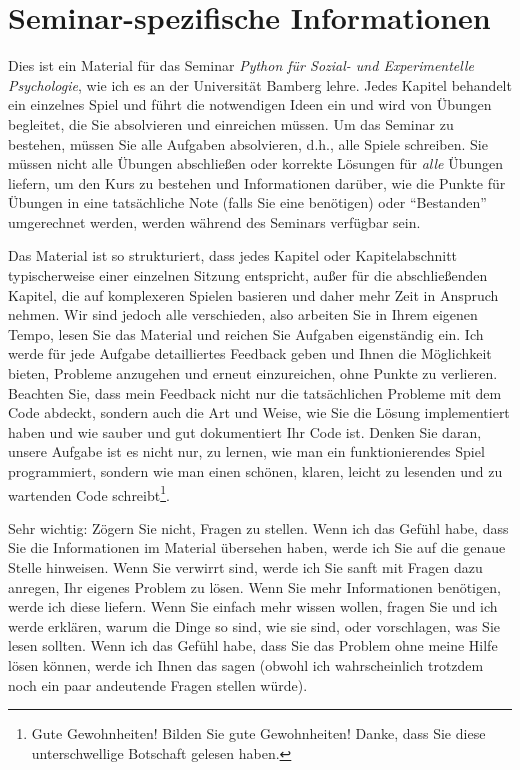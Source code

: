 \documentclass[
]{book}
\begin{document}
\hypertarget{seminar-spezifische-informationen}{%
\section{Seminar-spezifische Informationen}\label{seminar-spezifische-informationen}}

Dies ist ein Material für das Seminar \emph{Python für Sozial- und Experimentelle Psychologie}, wie ich es an der Universität Bamberg lehre. Jedes Kapitel behandelt ein einzelnes Spiel und führt die notwendigen Ideen ein und wird von Übungen begleitet, die Sie absolvieren und einreichen müssen. Um das Seminar zu bestehen, müssen Sie alle Aufgaben absolvieren, d.h., alle Spiele schreiben. Sie müssen nicht alle Übungen abschließen oder korrekte Lösungen für \emph{alle} Übungen liefern, um den Kurs zu bestehen und Informationen darüber, wie die Punkte für Übungen in eine tatsächliche Note (falls Sie eine benötigen) oder ``Bestanden'' umgerechnet werden, werden während des Seminars verfügbar sein.

Das Material ist so strukturiert, dass jedes Kapitel oder Kapitelabschnitt typischerweise einer einzelnen Sitzung entspricht, außer für die abschließenden Kapitel, die auf komplexeren Spielen basieren und daher mehr Zeit in Anspruch nehmen. Wir sind jedoch alle verschieden, also arbeiten Sie in Ihrem eigenen Tempo, lesen Sie das Material und reichen Sie Aufgaben eigenständig ein. Ich werde für jede Aufgabe detailliertes Feedback geben und Ihnen die Möglichkeit bieten, Probleme anzugehen und erneut einzureichen, ohne Punkte zu verlieren. Beachten Sie, dass mein Feedback nicht nur die tatsächlichen Probleme mit dem Code abdeckt, sondern auch die Art und Weise, wie Sie die Lösung implementiert haben und wie sauber und gut dokumentiert Ihr Code ist. Denken Sie daran, unsere Aufgabe ist es nicht nur, zu lernen, wie man ein funktionierendes Spiel programmiert, sondern wie man einen schönen, klaren, leicht zu lesenden und zu wartenden Code schreibt\footnote{Gute Gewohnheiten! Bilden Sie gute Gewohnheiten! Danke, dass Sie diese unterschwellige Botschaft gelesen haben.}.

Sehr wichtig: Zögern Sie nicht, Fragen zu stellen. Wenn ich das Gefühl habe, dass Sie die Informationen im Material übersehen haben, werde ich Sie auf die genaue Stelle hinweisen. Wenn Sie verwirrt sind, werde ich Sie sanft mit Fragen dazu anregen, Ihr eigenes Problem zu lösen. Wenn Sie mehr Informationen benötigen, werde ich diese liefern. Wenn Sie einfach mehr wissen wollen, fragen Sie und ich werde erklären, warum die Dinge so sind, wie sie sind, oder vorschlagen, was Sie lesen sollten. Wenn ich das Gefühl habe, dass Sie das Problem ohne meine Hilfe lösen können, werde ich Ihnen das sagen (obwohl ich wahrscheinlich trotzdem noch ein paar andeutende Fragen stellen würde).
\end{document}
